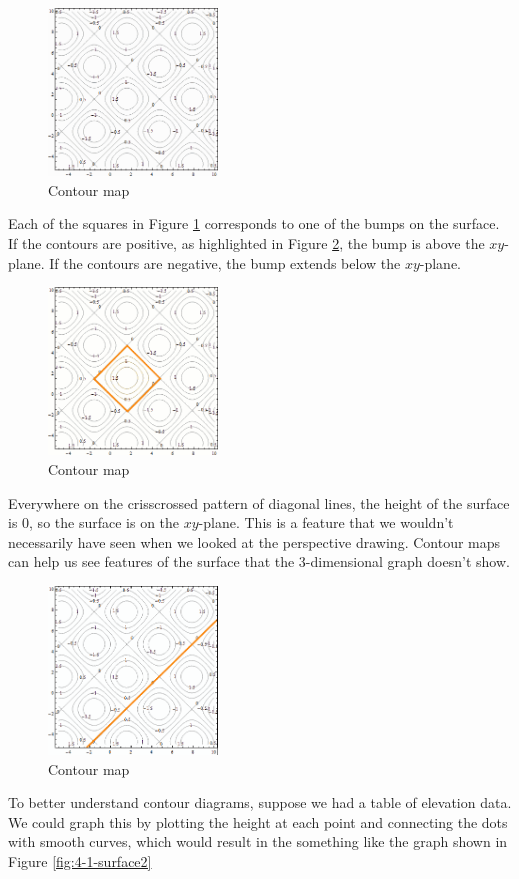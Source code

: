 \begin{figure}[!ht]
  \centering
    \includegraphics[width=0.4\textwidth]{img/chap4/image015.png}
    \caption{Contour map}
    \label{fig:4-1-contour1}
  \end{figure}
Each of the squares in Figure \ref{fig:4-1-contour1} corresponds to one of the bumps on the surface. If the contours are positive, as highlighted in Figure \ref{fig:4-1-contour2}, the bump is above the $xy$-plane. If the contours are negative, the bump extends below the $xy$-plane.

\begin{figure}[!ht]
  \centering
    \includegraphics[width=0.4\textwidth]{img/chap4/image016.png}
    \caption{Contour map}
    \label{fig:4-1-contour2}
  \end{figure}
Everywhere on the crisscrossed pattern of diagonal lines, the height of the surface is 0, so the surface is on the $xy$-plane. This is a feature that we wouldn't necessarily have seen when we looked at the perspective drawing. Contour maps can help us see features of the surface that the 3-dimensional graph doesn't show.

\begin{figure}[!ht]
  \centering
    \includegraphics[width=0.4\textwidth]{img/chap4/image017.png}
    \caption{Contour map}
    \label{fig:4-1-contour3}
  \end{figure}
To better understand contour diagrams, suppose we had a table of elevation data. We could graph this by plotting the height at each point and connecting the dots with smooth curves, which would result in the something like the graph shown in Figure \ref{fig:4-1-surface2}

